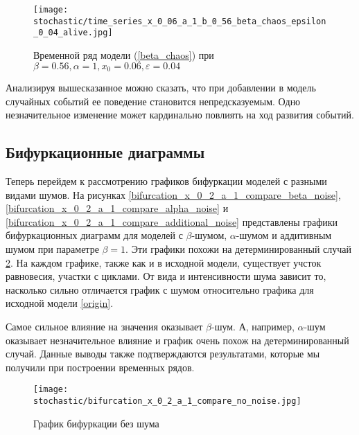         \begin{figure}
            \centering
            \texttt{[image: stochastic/time\_series\_x\_0\_06\_a\_1\_b\_0\_56\_beta\_chaos\_epsilon\_0\_04\_alive.jpg]}
        
            \captionsetup{justification=centering}
            \caption{Временной ряд модели (\ref{beta_chaos}) при \(\beta = 0.56, \alpha = 1, x_0 = 0.06, \varepsilon = 0.04\)}
            \label{time_series_x_0_06_a_1_b_0_56_beta_chaos_epsilon_0_04_alive}
        \end{figure}

        Анализируя вышесказанное можно сказать, что при добавлении в модель случайных событий ее поведение становится непредсказуемым. Одно незначительное изменение может кардинально повлиять на ход развития событий. 


    \subsection{Бифуркационные диаграммы}

        Теперь перейдем к рассмотрению графиков бифуркации моделей с разными видами шумов. На рисунках \ref{bifurcation_x_0_2_a_1_compare_beta_noise}, \ref{bifurcation_x_0_2_a_1_compare_alpha_noise} и \ref{bifurcation_x_0_2_a_1_compare_additional_noise} представлены графики бифуркационных диаграмм для моделей с \(\beta\)-шумом, \(\alpha\)-шумом и аддитивным шумом при параметре \(\beta = 1\). Эти графики похожи на детерминированный случай \ref{bifurcation_x_0_2_a_1_compare_no_noise}. На каждом графике, также как и в исходной модели, существует учсток равновесия, участки с циклами. От вида и интенсивности шума зависит то, насколько сильно отличается график с шумом относительно графика для исходной модели \ref{origin}. 

        Самое сильное влияние на значения оказывает \(\beta\)-шум. А, например, \(\alpha\)-шум оказывает незначительное влияние и график очень похож на детерминированный случай. Данные выводы также подтверждаются результатами, которые мы получили при построении временных рядов.


        \begin{figure}
            \centering
            \texttt{[image: stochastic/bifurcation\_x\_0\_2\_a\_1\_compare\_no\_noise.jpg]}
        
            \captionsetup{justification=centering}
            \caption{График бифуркации без шума}
            \label{bifurcation_x_0_2_a_1_compare_no_noise}
        \end{figure}


